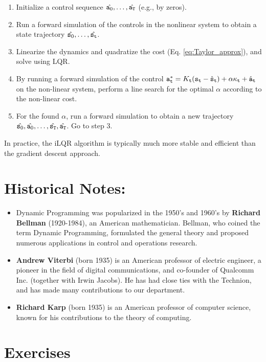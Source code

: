 \begin{enumerate}
    \item Initialize a control sequence $\hat{{\tt a}_0},\dots,\hat{{\tt a}_{\tt T}}$ (e.g., by zeros).
    \item Run a forward simulation of the controls in the nonlinear system to obtain a state trajectory $\hat{{\tt s}_0},\dots,\hat{{\tt s}_{\tt t}}$.
    \item Linearize the dynamics and quadratize the cost (Eq. \ref{eq:Taylor_approx}), and solve using LQR.
    \item By running a forward simulation of the control ${\tt a}_{\tt t}^* = K_{\tt t} ({\tt s}_{\tt t} - \hat{{\tt s}}_{\tt t}) + \alpha \kappa_{\tt t} + \hat{{\tt a}}_{\tt t}$ on the non-linear system, perform a line search for the optimal $\alpha$ according to the non-linear cost.
    \item For the found $\alpha$, run a forward simulation to obtain a new trajectory  $\hat{{\tt s}_0},\hat{{\tt a}_0},\dots,\hat{{\tt s}_{\tt T}},\hat{{\tt a}_{\tt T}}$. Go to step 3.
\end{enumerate}

In practice, the iLQR algorithm is typically much more stable and efficient than the gradient descent approach.

\section{Historical Notes:}
\begin{itemize}
  \item Dynamic Programming was popularized in the 1950's and 1960's by \textbf{Richard Bellman} (1920-1984), an American mathematician. Bellman, who coined the term Dynamic Programming, formulated the general theory and proposed numerous applications in control and operations research.
  \item \textbf{Andrew Viterbi} (born 1935) is an American professor of electric engineer, a pioneer in the field of digital communications, and co-founder of Qualcomm Inc. (together with Irwin Jacobs). He has had close ties with the Technion, and has made many contributions to our department.
  \item \textbf{Richard Karp} (born 1935) is an American professor
  of computer science, known for his contributions to the theory of
  computing.
\end{itemize}


\section*{Exercises}




%
